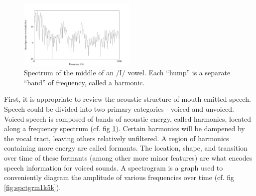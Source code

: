\documentclass[dissertation,copyright]{uathesis}
\begin{document}
\begin{figure}
\centering
  \includegraphics[width=0.5\textwidth]{figure/spctrm5k.png}
  \caption{Spectrum of the middle of an /I/ vowel.  Each ``hump'' is a separate ``band'' of frequency, called a harmonic.}
  \label{fig:spctrm5k}
\end{figure}
%
First, it is appropriate to review the acoustic structure of mouth emitted speech.  Speech could be divided into two primary categories - voiced and unvoiced.  Voiced speech is composed of bands of acoustic energy, called harmonics, located along a frequency spectrum (cf. fig \ref{fig:spctrm5k}).  
%
Certain harmonics will be dampened by the vocal tract, leaving others relatively unfiltered.  A region of harmonics containing more energy are called formants.  The location, shape, and transition over time of these formants (among other more minor features) are what encodes speech information for voiced sounds.  A spectrogram is a graph used to conveniently diagram the amplitude of various frequencies over time (cf. fig \ref{fig:spctgrm1k5k}).
%
\end{document}
